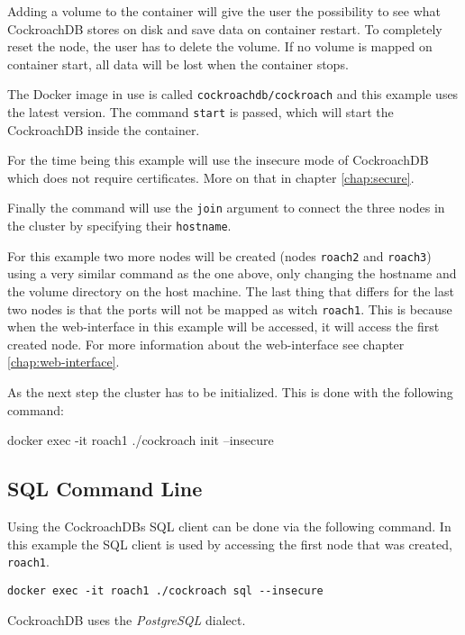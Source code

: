 \medskip
Adding a volume to the container will give the user the possibility to see what CockroachDB stores on disk and save data on container restart. To completely reset the node, the user has to delete the volume. If no volume is mapped on container start, all data will be lost when the container stops. 

\medskip
The Docker image in use is called \verb|cockroachdb/cockroach| and this example uses the latest version. The command \verb|start| is passed, which will start the CockroachDB inside the container.

\medskip
For the time being this example will use the insecure mode of CockroachDB which does not require certificates. More on that in chapter \ref{chap:secure}. 

\medskip
Finally the command will use the \verb|join| argument to connect the three nodes in the cluster by specifying their \verb|hostname|.

\bigskip
For this example two more nodes will be created (nodes \verb|roach2| and \verb|roach3|) using a very similar command as the one above, only changing the hostname and the volume directory on the host machine. The last thing that differs for the last two nodes is that the ports will not be mapped as witch \verb|roach1|. This is because when the web-interface in this example will be accessed, it will access the first created node. For more information about the web-interface see chapter \ref{chap:web-interface}.
\bigskip

As the next step the cluster has to be initialized. This is done with the following command:

\begin{verb}
docker exec -it roach1 ./cockroach init --insecure
\end{verb}

\cite{cockroachdocker}

\subsection{SQL Command Line}
Using the CockroachDBs SQL client can be done via the following command. In this example the SQL client is used by accessing the first node that was created, \verb|roach1|.
\begin{verbatim}
docker exec -it roach1 ./cockroach sql --insecure
\end{verbatim}

CockroachDB uses the \emph{PostgreSQL} dialect.

